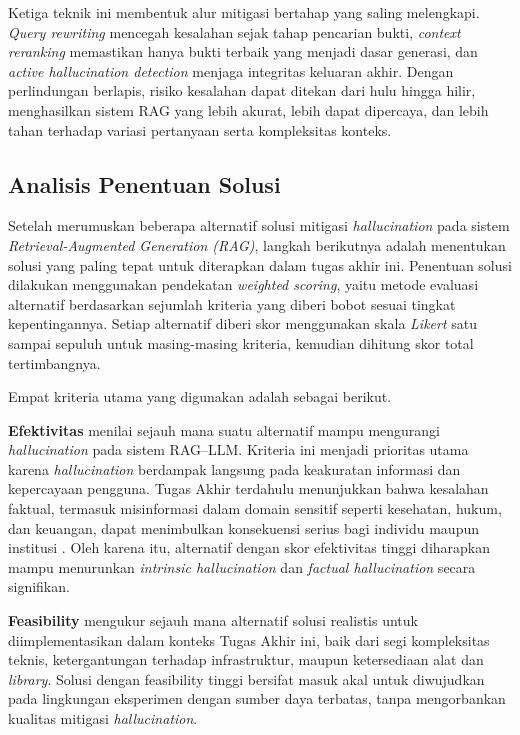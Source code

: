 Ketiga teknik ini membentuk alur mitigasi bertahap yang saling melengkapi. \textit{Query rewriting} mencegah kesalahan sejak tahap pencarian bukti, \textit{context reranking} memastikan hanya bukti terbaik yang menjadi dasar generasi, dan \textit{active hallucination detection} menjaga integritas keluaran akhir. Dengan perlindungan berlapis, risiko kesalahan dapat ditekan dari hulu hingga hilir, menghasilkan sistem RAG yang lebih akurat, lebih dapat dipercaya, dan lebih tahan terhadap variasi pertanyaan serta kompleksitas konteks.



\subsection{Analisis Penentuan Solusi}
\label{subsec:analisis-penentuan-solusi}

Setelah merumuskan beberapa alternatif solusi mitigasi \textit{hallucination} pada sistem \textit{Retrieval-Augmented Generation (RAG)}, langkah berikutnya adalah menentukan solusi yang paling tepat untuk diterapkan dalam tugas akhir ini. Penentuan solusi dilakukan menggunakan pendekatan \textit{weighted scoring}, yaitu metode evaluasi alternatif berdasarkan sejumlah kriteria yang diberi bobot sesuai tingkat kepentingannya. Setiap alternatif diberi skor menggunakan skala \textit{Likert} satu sampai sepuluh untuk masing-masing kriteria, kemudian dihitung skor total tertimbangnya.

Empat kriteria utama yang digunakan adalah sebagai berikut.  

\textbf{Efektivitas} menilai sejauh mana suatu alternatif mampu mengurangi \textit{hallucination} pada sistem RAG–LLM. Kriteria ini menjadi prioritas utama karena \textit{hallucination} berdampak langsung pada keakuratan informasi dan kepercayaan pengguna. Tugas Akhir terdahulu menunjukkan bahwa kesalahan faktual, termasuk misinformasi dalam domain sensitif seperti kesehatan, hukum, dan keuangan, dapat menimbulkan konsekuensi serius bagi individu maupun institusi \parencite{pang2024medical}. Oleh karena itu, alternatif dengan skor efektivitas tinggi diharapkan mampu menurunkan \textit{intrinsic hallucination} dan \textit{factual hallucination} secara signifikan.

\textbf{Feasibility} mengukur sejauh mana alternatif solusi realistis untuk diimplementasikan dalam konteks Tugas Akhir ini, baik dari segi kompleksitas teknis, ketergantungan terhadap infrastruktur, maupun ketersediaan alat dan \textit{library}. Solusi dengan feasibility tinggi bersifat masuk akal untuk diwujudkan pada lingkungan eksperimen dengan sumber daya terbatas, tanpa mengorbankan kualitas mitigasi \textit{hallucination}.

